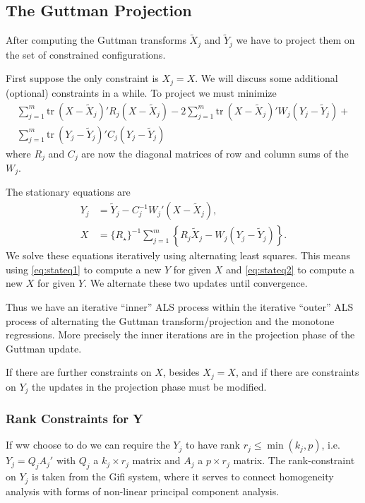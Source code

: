\documentclass[
  12pt,
]{article}
\begin{document}
\subsection{The Guttman Projection}\label{the-guttman-projection}

After computing the Guttman transforms \(\tilde X_j\) and \(\tilde Y_j\) we have to project them on the set of constrained configurations.

First suppose the only constraint is \(X_j=X\). We will discuss some additional (optional) constraints in a while. To project we must minimize
\begin{multline}
\sum_{j=1}^m\text{tr}\ (X-\tilde X_j)'R_j(X-\tilde X_j)-2\sum_{j=1}^m\text{tr}\ (X-\tilde X_j)'W_j(Y_j-\tilde Y_j)+\\
\sum_{j=1}^m\text{tr}\ (Y_j-\tilde Y_j)'C_j(Y_j-\tilde Y_j)
\end{multline}
where \(R_j\) and \(C_j\) are now the diagonal matrices of row and column sums of the \(W_j\).

The stationary equations are
\begin{align}
Y_j&=\tilde Y_j-C_j^{-1}W_j'(X-\tilde X_j),\label{eq:stateq1}\\
X&=\{R_\star\}^{-1}\sum_{j=1}^m\left\{R_j\tilde X_j-W_j(Y_j-\tilde Y_j)\right\}.\label{eq:stateq2}
\end{align}
We solve these equations iteratively using alternating least squares.
This means using \eqref{eq:stateq1} to compute a new \(Y\) for given \(X\) and \eqref{eq:stateq2} to compute a new \(X\) for given \(Y\). We alternate these two updates until convergence.

Thus we have an iterative ``inner'' ALS process within the iterative
``outer'' ALS process of alternating the Guttman transform/projection and the monotone regressions. More precisely the inner iterations are in the
projection phase of the Guttman update.

If there are further constraints on \(X\), besides \(X_j=X\), and if there
are constraints on \(Y_j\) the updates in the projection phase must
be modified.

\subsubsection{Rank Constraints for Y}\label{rank-constraints-for-y}

If ww choose to do we can require the \(Y_j\) to have rank \(r_j\leq\min(k_j,p)\), i.e.~\(Y_j=Q_jA_j'\)
with \(Q_j\) a \(k_j\times r_j\) matrix and \(A_j\) a \(p\times r_j\) matrix.
The rank-constraint on \(Y_j\) is taken from the Gifi system, where it serves to connect homogeneity analysis with forms of non-linear principal
component analysis.
\end{document}
